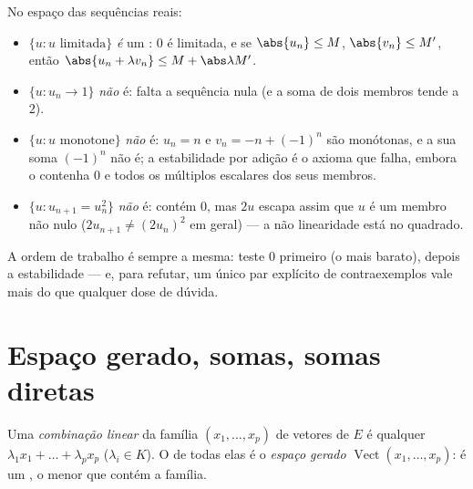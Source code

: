 \begin{example}
\label{ex:b1:vspaces:subspaceornot}
No espaço das sequências reais:
\begin{itemize}
  \item $\{u : u \text{ limitada}\}$ \emph{é} um : $0$ é
        limitada, e se $\abs{u_n} \leq M$, $\abs{v_n} \leq M'$,
        então $\abs{u_n + \lambda v_n} \leq M + \abs\lambda M'$.
  \item $\{u : u_n \to 1\}$ \emph{não} é: falta a sequência nula (e a soma de
        dois membros tende a $2$).
  \item $\{u : u \text{ monotone}\}$ \emph{não} é: $u_n = n$
        e $v_n = -n + (-1)^n$ são monótonas, e a sua soma
        $(-1)^n$ não é; a estabilidade por adição é o axioma
        que falha, embora o  contenha $0$ e todos os
        múltiplos escalares dos seus membros.
  \item $\{u : u_{n+1} = u_n^2\}$ \emph{não} é: contém $0$,
        mas $2u$ escapa assim que $u$ é um membro não nulo
        ($2u_{n+1} \neq (2u_n)^2$ em geral) --- a não linearidade
        está no quadrado.
\end{itemize}
A ordem de trabalho é sempre a mesma: teste $0$ primeiro (o mais
barato), depois a estabilidade --- e, para refutar, um único par
explícito de contraexemplos vale mais do que qualquer dose de dúvida.
\end{example}

\section{Espaço gerado, somas, somas diretas}

\begin{definition}\label{def:b1:vspaces:span}
Uma \emph{combinação linear} da família $(x_1, \dots, x_p)$ de
vetores de $E$ é qualquer $\lambda_1 x_1 + \dots + \lambda_p x_p$
($\lambda_i \in K$). O  de todas elas é o
\emph{espaço gerado} $\operatorname{Vect}(x_1, \dots, x_p)$: é
um , o menor que contém a família.
\end{definition}

